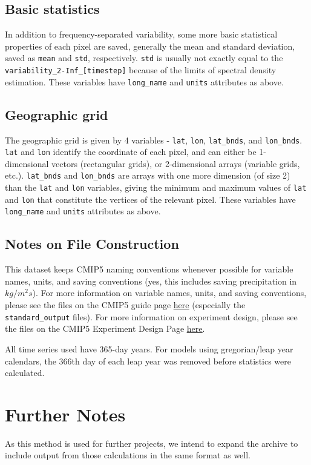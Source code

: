 \documentclass[11pt]{amsart}
\begin{document}
\subsection{Basic statistics}
In addition to frequency-separated variability, some more basic statistical properties of each pixel are saved, generally the mean and standard deviation, saved as \texttt{mean} and \texttt{std}, respectively. \texttt{std} is usually not exactly equal to the \texttt{variability\_2-Inf\_[timestep]} because of the limits of spectral density estimation. These variables have \texttt{long\_name} and \texttt{units} attributes as above. 

\subsection{Geographic grid}
The geographic grid is given by 4 variables - \texttt{lat}, \texttt{lon}, \texttt{lat\_bnds}, and \texttt{lon\_bnds}. \texttt{lat} and \texttt{lon} identify the coordinate of each pixel, and can either be 1-dimensional vectors (rectangular grids), or 2-dimensional arrays (variable grids, etc.). \texttt{lat\_bnds} and \texttt{lon\_bnds} are arrays with one more dimension (of size 2) than the \texttt{lat} and \texttt{lon} variables, giving the minimum and maximum values of \texttt{lat} and \texttt{lon} that constitute the vertices of the relevant pixel. These variables have \texttt{long\_name} and \texttt{units} attributes as above. 

\subsection{Notes on File Construction}
This dataset keeps CMIP5 naming conventions whenever possible for variable names, units, and saving conventions (yes, this includes saving precipitation in $kg/m^2s$). For more information on variable names, units, and saving conventions, please see the files on the CMIP5 guide page \href{http://cmip-pcmdi.llnl.gov/cmip5/guide_to_cmip5.html}{\underline{here}} (especially the \texttt{standard\_output} files). For more information on experiment design, please see the files on the CMIP5 Experiment Design Page \href{http://cmip-pcmdi.llnl.gov/cmip5/experiment_design.html}{\underline{here}}. 

All time series used have 365-day years. For models using gregorian/leap year calendars, the 366th day of each leap year was removed before statistics were calculated. 

\section{Further Notes}
As this method is used for further projects, we intend to expand the archive to include output from those calculations in the same format as well.
\end{document}
